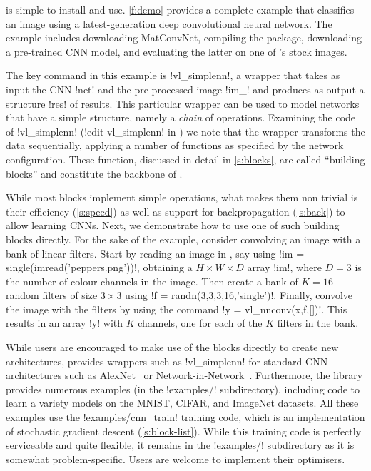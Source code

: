 \matconvnet is simple to install and use. \autoref{f:demo} provides a complete example that classifies an image using a latest-generation deep convolutional neural network. The example includes downloading MatConvNet, compiling the package, downloading a pre-trained CNN model, and evaluating the latter on one of \matlab's stock images.

The key command in this example is !vl_simplenn!, a wrapper that takes as input the CNN !net! and the pre-processed image !im_! and produces as output a structure !res! of results. This particular wrapper can be used to model networks that have a simple structure, namely a \emph{chain} of operations. Examining the code of !vl_simplenn! (!edit vl_simplenn! in \matconvnet) we note that the wrapper transforms the data sequentially, applying a number of \matlab functions as specified by the network configuration. These function, discussed in detail in \autoref{s:blocks}, are called ``building blocks'' and constitute the backbone of \matconvnet. 


While most blocks implement simple operations, what makes them non trivial is their efficiency (\autoref{s:speed}) as well as support for backpropagation (\autoref{s:back}) to allow learning CNNs. Next, we demonstrate how to use one of such building blocks directly. For the sake of the example, consider convolving an image with a bank of linear filters. Start by reading an image in \matlab, say using !im = single(imread('peppers.png'))!, obtaining a $H \times W \times D$ array !im!, where $D=3$ is the number of colour channels in the image. Then create a bank of $K=16$ random filters of size $3 \times 3$ using !f = randn(3,3,3,16,'single')!. Finally, convolve the image with the filters by using the command !y = vl_nnconv(x,f,[])!. This results in an array !y! with $K$ channels, one for each of the $K$ filters in the bank. 

While users are encouraged to make use of the blocks directly to create new architectures, \matlab provides wrappers such as !vl_simplenn! for standard CNN architectures such as AlexNet~\cite{krizhevsky12imagenet} or Network-in-Network~\cite{lin13network}. Furthermore, the library provides numerous examples (in the !examples/! subdirectory), including code to learn a variety models on the MNIST, CIFAR, and ImageNet datasets. All these examples use the !examples/cnn_train! training code, which is an implementation of stochastic gradient descent (\autoref{s:block-list}). While this training code is perfectly serviceable and quite flexible, it remains in the !examples/! subdirectory as it is somewhat problem-specific. Users are welcome to implement their optimisers.


